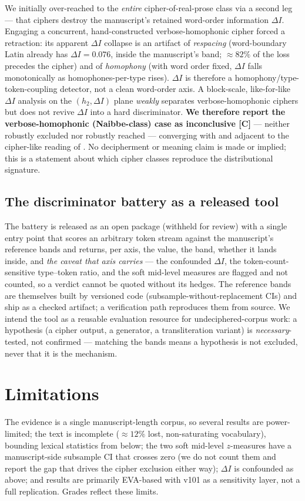 \documentclass[11pt]{article}
\newcommand{\grade}[1]{{\small\textbf{[#1]}}}
\begin{document}
We initially over-reached to the \emph{entire} cipher-of-real-prose class via a second leg ---
that ciphers destroy the manuscript's retained word-order information $\Delta I$. Engaging a
concurrent, hand-constructed verbose-homophonic cipher \citep{greshko2025naibbe} forced a
retraction: its apparent $\Delta I$ collapse is an artifact of \emph{respacing} (word-boundary
Latin already has $\Delta I=0.076$, inside the manuscript's band; $\approx\!82\%$ of the loss
precedes the cipher) and of \emph{homophony} (with word order fixed, $\Delta I$ falls
monotonically as homophones-per-type rises). $\Delta I$ is therefore a
homophony/type-token-coupling detector, not a clean word-order axis. A block-scale, like-for-like
$\Delta I$ analysis on the $(h_2,\Delta I)$ plane \emph{weakly} separates verbose-homophonic
ciphers but does not revive $\Delta I$ into a hard discriminator. \textbf{We therefore report the
verbose-homophonic (Naibbe-class) case as inconclusive \grade{C}} --- neither robustly excluded
nor robustly reached --- converging with \citet{greshko2025naibbe} and adjacent to the
cipher-like reading of \citet{parisel2026layered}. No decipherment or meaning claim is made or
implied; this is a statement about which cipher classes reproduce the distributional signature.

\subsection{The discriminator battery as a released tool}
\label{sec:tool}
The battery is released as an open package (withheld for review) with a single entry point that
scores an arbitrary token stream against the manuscript's reference bands and returns, per axis,
the value, the band, whether it lands inside, and \emph{the caveat that axis carries} --- the
confounded $\Delta I$, the token-count-sensitive type--token ratio, and the soft mid-level
measures are flagged and not counted, so a verdict cannot be quoted without its hedges. The
reference bands are themselves built by versioned code (subsample-without-replacement CIs) and
ship as a checked artifact; a verification path reproduces them from source. We intend the tool
as a reusable evaluation resource for undeciphered-corpus work: a hypothesis (a cipher output, a
generator, a transliteration variant) is \emph{necessary}-tested, not confirmed --- matching the
bands means a hypothesis is not excluded, never that it is the mechanism.

\section{Limitations}
\label{sec:limits}
The evidence is a single manuscript-length corpus, so several results are power-limited; the
text is incomplete ($\approx\!12\%$ lost, non-saturating vocabulary), bounding lexical
statistics from below; the two soft mid-level $z$-measures have a manuscript-side subsample CI
that crosses zero (we do not count them and report the gap that drives the cipher exclusion
either way); $\Delta I$ is confounded as above; and results are primarily EVA-based with v101 as
a sensitivity layer, not a full replication. Grades reflect these limits.
\end{document}
